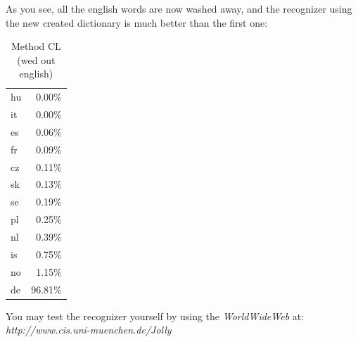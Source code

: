 As you see, all the english words are now washed away, and the recognizer using the new created dictionary is much better than the first one:
\begin{table}
\begin{center}
\begin{tabular}{|l|r|}
\hline
hu  &0.00\% \\
it  &0.00\% \\
es  &0.06\% \\
fr  &0.09\% \\
cz  &0.11\% \\
sk  &0.13\% \\
se  &0.19\% \\
pl  &0.25\% \\
nl  &0.39\% \\
is  &0.75\% \\
no  &1.15\% \\
de  &96.81\% \\
\hline
\end{tabular}
\end{center}
\caption{Method CL (wed out english)}
\end{table}

You may test the recognizer yourself by using the {\it World\-Wide\-Web } at: \mbox{\it http://www.cis.uni-muenchen.de/Jolly}
\pagebreak

